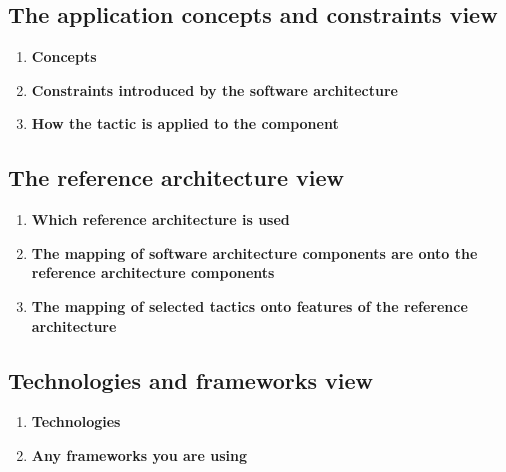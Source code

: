 \documentclass[11pt]{article}
\begin{document}
	\subsection{The application concepts and constraints view}
	\begin{enumerate}
		\item \textbf {Concepts}
		\item \textbf {Constraints introduced by the software architecture}
		\item \textbf {How the tactic is applied to the component}
	\end{enumerate}
	\subsection{The reference architecture view}
	\begin{enumerate}
		\item \textbf {Which reference architecture is used}
		\item \textbf {The mapping of software architecture components are onto the reference architecture components}
		\item \textbf {The mapping of selected tactics onto features of the reference architecture}
	\end{enumerate}
	\subsection{Technologies and frameworks view}
	\begin{enumerate}
		\item \textbf {Technologies}
		\item \textbf {Any frameworks you are using}
	\end{enumerate}
\end{document}
